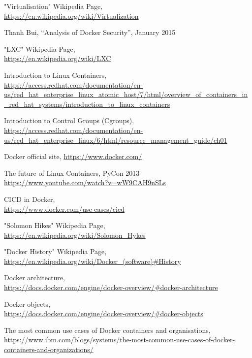 \documentclass[a4paper,12pt]{article}
\begin{document}
\newpage

\begin{thebibliography}{99}

"Virtualisation" Wikipedia Page,\\ \url{https://en.wikipedia.org/wiki/Virtualization}

Thanh Bui,
``Analysis of Docker Security'',
January 2015

"LXC" Wikipedia Page,\\ \url{https://en.wikipedia.org/wiki/LXC}

Introduction to Linux Containers,\\ \url{https://access.redhat.com/documentation/en-us/red_hat_enterprise_linux_atomic_host/7/html/overview_of_containers_in_red_hat_systems/introduction_to_linux_containers}
  
Introduction to Control Groups (Cgroups),\\ \url{https://access.redhat.com/documentation/en-us/red_hat_enterprise_linux/6/html/resource_management_guide/ch01}

Docker official site, \url{https://www.docker.com/}

The future of Linux Containers, PyCon 2013\\ \url{https://www.youtube.com/watch?v=wW9CAH9nSLs}

CI\/CD in Docker,\\ \url{https://www.docker.com/use-cases/cicd}

"Solomon Hikes" Wikipedia Page,\\ \url{https://en.wikipedia.org/wiki/Solomon_Hykes}

"Docker History" Wikipedia Page,\\ \url{https://en.wikipedia.org/wiki/Docker_(software)#History}

Docker architecture,\\ \url{https://docs.docker.com/engine/docker-overview/#docker-architecture}

Docker objects,\\ \url{https://docs.docker.com/engine/docker-overview/#docker-objects}

The most common use cases of Docker containers and organisations, \\ \url{https://www.ibm.com/blogs/systems/the-most-common-use-cases-of-docker-containers-and-organizations/}


\end{thebibliography}
\end{document}
